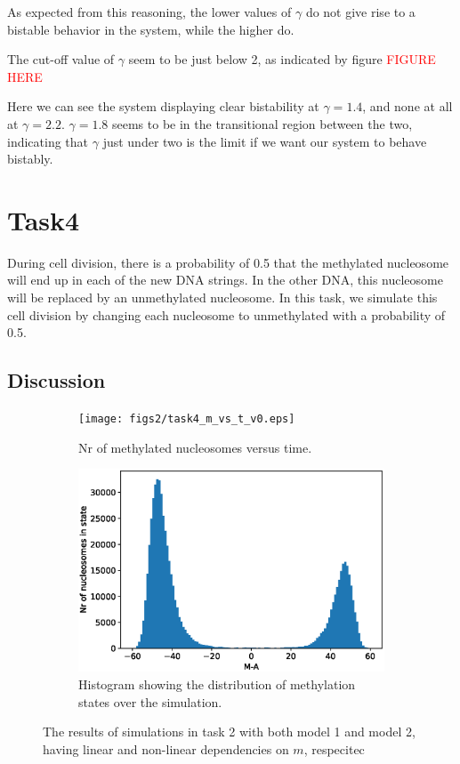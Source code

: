 \documentclass{article}
\begin{document}
As expected from this reasoning, the lower values of $\gamma$ do not give rise to a bistable behavior in the system, while the higher do. 

The cut-off value of $\gamma$ seem to be just below 2, as indicated by figure \textcolor{red}{FIGURE HERE}

Here we can see the system displaying clear bistability at $\gamma = 1.4$, and none at all at $\gamma= 2.2$. $\gamma= 1.8$ seems to be in the transitional region between the two, indicating that $\gamma$ just under two is the limit if we want our system to behave bistably. 








\section{Task4}
During cell division, there is a probability of 0.5 that the methylated nucleosome will end up in each of the new DNA strings. In the other DNA, this nucleosome will be replaced by an unmethylated nucleosome. 
In this task, we simulate this cell division by changing each nucleosome to unmethylated with a probability of 0.5.
\subsection{Discussion}

\begin{figure}[H]
	\centering
	\begin{subfigure}[b]{.49\textwidth}
		\centering
		\texttt{[image: figs2/task4\_m\_vs\_t\_v0.eps]}
		\caption{Nr of methylated nucleosomes versus time.\\ }
		\label{fig:task2_m_vs_t}
	\end{subfigure}
	\begin{subfigure}[b]{.49\textwidth}
		\centering
		\includegraphics[width= \linewidth]{figs2/task4_hist_v0.eps}
		\caption{Histogram showing the distribution of methylation states over the simulation.}
		\label{fig:task2_hist}
	\end{subfigure}
		\caption{The results of simulations in task 2 with both model 1 and model 2, having linear and non-linear dependencies on $m$, respecitec}
		\label{fig:task2}
\end{figure}
\end{document}
